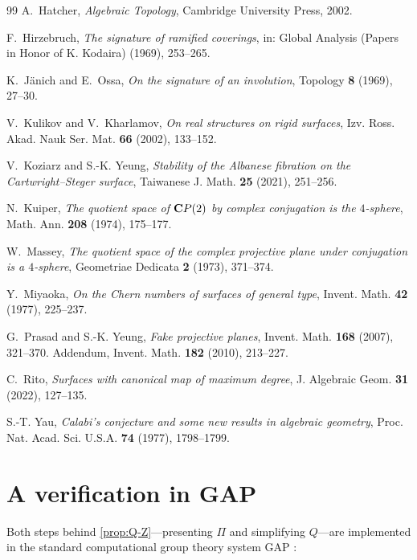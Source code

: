 \documentclass[11pt]{amsart}
\theoremstyle{definition}
\theoremstyle{remark}
\newcommand{\PiCS}{\Pi}
\begin{document}
\begin{thebibliography}{99}
A.~Hatcher,
\emph{Algebraic Topology},
Cambridge University Press, 2002.

F.~Hirzebruch, 
\emph{The signature of ramified coverings},
 in: Global {A}nalysis ({P}apers in {H}onor of {K}. {K}odaira)
  (1969), 253--265.
 
K.~J\"{a}nich and E.~Ossa,
\emph{On the signature of an involution},
Topology \textbf{8} (1969), 27--30.

V.~Kulikov and V.~Kharlamov, 
\emph{On real structures on rigid surfaces},
Izv. Ross. Akad. Nauk Ser. Mat. \textbf{66} (2002), 133--152.

V.~Koziarz and S.-K. Yeung,
\emph{Stability of the Albanese fibration on the Cartwright--Steger surface},
Taiwanese J. Math. \textbf{25} (2021), 251--256.

N.~Kuiper, 
\emph{The quotient space of {${\bf C}P(2)$} by complex conjugation
              is the {$4$}-sphere},
Math. Ann. \textbf{208} (1974), 175--177.

W.~Massey, 
\emph{The quotient space of the complex projective plane under
              conjugation is a {$4$}-sphere},
Geometriae Dedicata \textbf{2} (1973), 371--374.

Y.~Miyaoka,
\emph{On the Chern numbers of surfaces of general type},
Invent. Math. \textbf{42} (1977), 225--237.

G.~Prasad and S.-K. Yeung,
\emph{Fake projective planes},
Invent. Math. \textbf{168} (2007), 321--370.
Addendum, Invent. Math. \textbf{182} (2010), 213--227.

C.~Rito,
\emph{Surfaces with canonical map of maximum degree},
J. Algebraic Geom. \textbf{31} (2022), 127--135.

S.-T. Yau,
\emph{Calabi's conjecture and some new results in algebraic geometry},
Proc. Nat. Acad. Sci. U.S.A. \textbf{74} (1977), 1798--1799.
\end{thebibliography}

\newpage

\appendix
\section{A verification in \texorpdfstring{\textsf{GAP}}{GAP}}\label{app:gap}

Both steps behind \cref{prop:Q-Z}---presenting $\PiCS$ and simplifying
$Q$---are implemented in the standard computational group theory system
\textsf{GAP} \cite{GAP4}:
\end{document}
